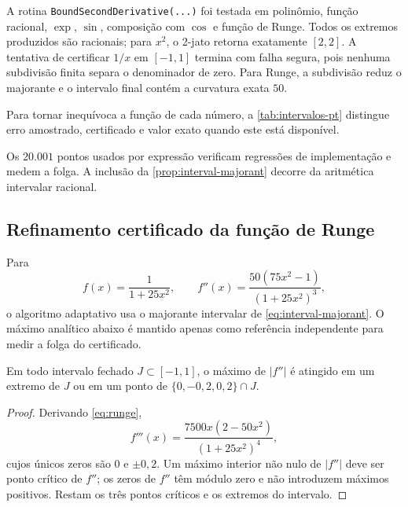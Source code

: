 A rotina \texttt{BoundSecondDerivative(...)} foi testada em polinômio, função
racional, $\exp$, $\sin$, composição com $\cos$ e função de Runge. Todos os
extremos produzidos são racionais; para $x^2$, o 2-jato retorna exatamente
$[2,2]$. A tentativa de certificar $1/x$ em $[-1,1]$ termina com falha segura,
pois nenhuma subdivisão finita separa o denominador de zero. Para Runge, a
subdivisão reduz o majorante e o intervalo final contém a curvatura exata
$50$.

Para tornar inequívoca a função de cada número, a \cref{tab:intervalos-pt}
distingue erro amostrado, certificado e valor exato quando este está
disponível.
\begin{table}[t]
\centering
\caption{Três níveis de validação; somente $e_{\rm cert}$ sustenta uma
garantia quando $e_{\rm exato}$ não é conhecido.}
\label{tab:intervalos-pt}
\small

\end{table}
Os $20.001$ pontos usados por expressão verificam regressões de implementação
e medem a folga. A inclusão da \cref{prop:interval-majorant} decorre da
aritmética intervalar racional.

\subsection{Refinamento certificado da função de Runge}

Para
\begin{equation}
 f(x)=\frac{1}{1+25x^2},\qquad
 f''(x)=\frac{50(75x^2-1)}{(1+25x^2)^3},
 \label{eq:runge}
\end{equation}
o algoritmo adaptativo usa o majorante intervalar de
\eqref{eq:interval-majorant}. O máximo analítico abaixo é mantido apenas como
referência independente para medir a folga do certificado.

\begin{lemma}\label{lem:runge-majorant}
Em todo intervalo fechado $J\subset[-1,1]$, o máximo de $|f''|$ é atingido em um extremo de $J$ ou em um ponto de $\{0,-0{,}2,0{,}2\}\cap J$.
\end{lemma}

\begin{proof}
Derivando \eqref{eq:runge},
\[
 f'''(x)=\frac{7500x(2-50x^2)}{(1+25x^2)^4},
\]
cujos únicos zeros são $0$ e $\pm0{,}2$. Um máximo interior não nulo de $|f''|$ deve ser ponto crítico de $f''$; os zeros de $f''$ têm módulo zero e não introduzem máximos positivos. Restam os três pontos críticos e os extremos do intervalo.
\end{proof}

